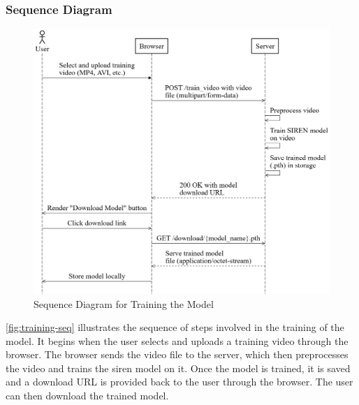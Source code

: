 \subsubsection{Sequence Diagram}
\begin{figure}[H]
    \centering
    \includegraphics[width=\linewidth]{assets/website/training_seq.png}
    \caption{Sequence Diagram for Training the Model}
    \label{fig:training-seq}
\end{figure}
\autoref{fig:training-seq} illustrates the sequence of steps involved in the training of the model. It begins when the user selects and uploads a training video through the browser. The browser sends the video file to the server, which then preprocesses the video and trains the \gls{siren} model on it. Once the model is trained, it is saved and a download URL is provided back to the user through the browser. The user can then download the trained model.

